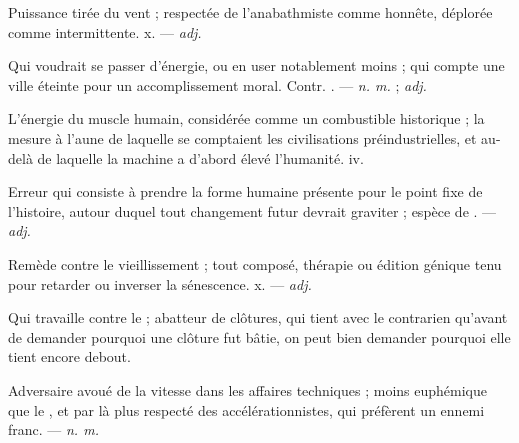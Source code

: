  Puissance tirée du vent ; respectée de l'anabathmiste comme honnête, déplorée comme intermittente.   x. ---  \textit{adj.}

 Qui voudrait se passer d'énergie, ou en user notablement moins ; qui compte une ville éteinte pour un accomplissement moral. Contr. . ---  \textit{n. m.} ;  \textit{adj.}

 L'énergie du muscle humain, considérée comme un combustible historique ; la mesure à l'aune de laquelle se comptaient les civilisations préindustrielles, et au-delà de laquelle la machine a d'abord élevé l'humanité.   iv.

 Erreur qui consiste à prendre la forme humaine présente pour le point fixe de l'histoire, autour duquel tout changement futur devrait graviter ; espèce de . ---  \textit{adj.}

 Remède contre le vieillissement ; tout composé, thérapie ou édition génique tenu pour retarder ou inverser la sénescence.   x. ---  \textit{adj.}

 Qui travaille contre le  ; abatteur de clôtures, qui tient avec le contrarien qu'avant de demander pourquoi une clôture fut bâtie, on peut bien demander pourquoi elle tient encore debout.

 Adversaire avoué de la vitesse dans les affaires techniques ; moins euphémique que le , et par là plus respecté des accélérationnistes, qui préfèrent un ennemi franc. ---  \textit{n. m.}

